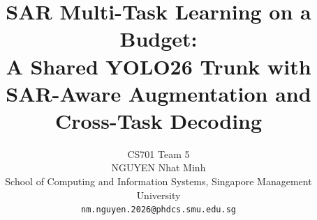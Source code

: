 \documentclass[10pt,twocolumn,letterpaper]{article}
\title{SAR Multi-Task Learning on a Budget:\\A Shared YOLO26 Trunk with SAR-Aware Augmentation and Cross-Task Decoding}
\author{CS701 Team 5\\
NGUYEN Nhat Minh \quad \\
School of Computing and Information Systems, Singapore Management University\\
{\tt\small nm.nguyen.2026@phdcs.smu.edu.sg}
}
\begin{document}
\maketitle






{
    \small
    
    
}

% 
\end{document}
